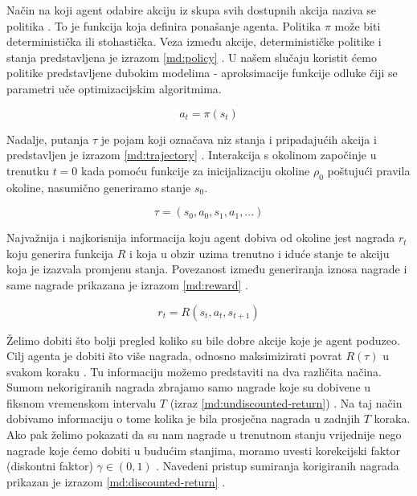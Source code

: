 Način na koji agent odabire akciju iz skupa svih dostupnih akcija naziva se politika . To je funkcija koja definira ponašanje agenta. Politika $\pi$ može biti deterministička ili stohastička. Veza između akcije, determinističke politike i stanja predstavljena je izrazom \ref{md:policy} \cite{PodUceFer}. U našem slučaju koristit ćemo politike predstavljene dubokim modelima - aproksimacije funkcije odluke čiji se parametri uče optimizacijskim algoritmima.  

\begin{equation}
    \label{md:policy}
    a_t = \pi(s_t)
\end{equation}

\bigskip

Nadalje, putanja $\tau$  je pojam koji označava niz stanja i pripadajućih akcija i predstavljen je izrazom \ref{md:trajectory} \cite{SpinningUp}. Interakcija s okolinom započinje u trenutku $t = 0$ kada pomoću funkcije za inicijalizaciju okoline $\rho_0$ poštujući pravila okoline, nasumično generiramo stanje $s_0$.

\begin{equation}
    \label{md:trajectory}
    \tau = (s_0, a_0, s_1, a_1, ...)
\end{equation}

\bigskip

Najvažnija i najkorisnija informacija koju agent dobiva od okoline jest nagrada $r_t$  koju generira funkcija $R$  i koja u obzir uzima trenutno i iduće stanje te akciju koja je izazvala promjenu stanja. Povezanost između generiranja iznosa nagrade i same nagrade prikazana je izrazom \ref{md:reward} \cite{SpinningUp}.

\begin{equation}
    \label{md:reward}
    r_t = R(s_t, a_t, s_{t+1})
\end{equation}

\bigskip

Želimo dobiti što bolji pregled koliko su bile dobre akcije koje je agent poduzeo. Cilj agenta je dobiti što više nagrada, odnosno maksimizirati povrat  $R(\tau)$ u svakom koraku \cite{PodUceFer}. Tu informaciju možemo predstaviti na dva različita načina. Sumom nekorigiranih nagrada zbrajamo samo nagrade koje su dobivene u fiksnom vremenskom intervalu $T$ (izraz \ref{md:undiscounted-return}) \cite{SpinningUp}. Na taj način dobivamo informaciju o tome kolika je bila prosječna nagrada u zadnjih $T$ koraka. Ako pak želimo pokazati da su nam nagrade u trenutnom stanju vrijednije nego nagrade koje ćemo dobiti u budućim stanjima, moramo uvesti korekcijski faktor (diskontni faktor) $\gamma \in (0,1)$ . Navedeni pristup sumiranja korigiranih nagrada prikazan je izrazom \ref{md:discounted-return} \cite{SpinningUp}.

